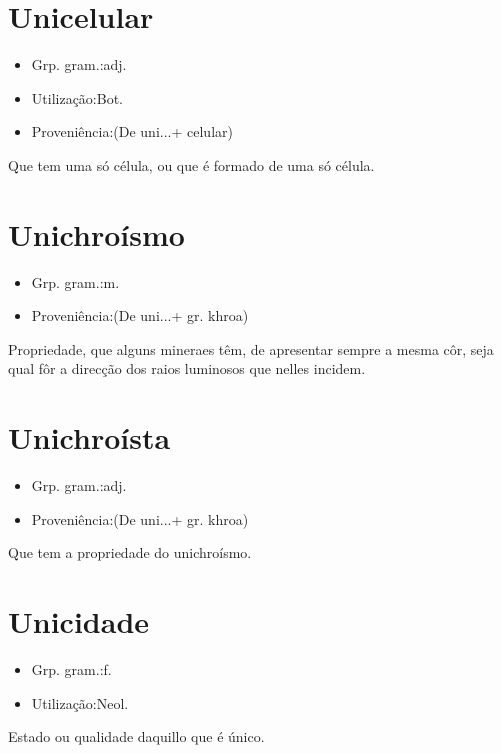\documentclass{article}
\begin{document}
\section{Unicelular}
\begin{itemize}
\item {Grp. gram.:adj.}
\end{itemize}
\begin{itemize}
\item {Utilização:Bot.}
\end{itemize}
\begin{itemize}
\item {Proveniência:(De \textunderscore uni...\textunderscore  + \textunderscore celular\textunderscore )}
\end{itemize}
Que tem uma só célula, ou que é formado de uma só célula.
\section{Unichroísmo}
\begin{itemize}
\item {Grp. gram.:m.}
\end{itemize}
\begin{itemize}
\item {Proveniência:(De \textunderscore uni...\textunderscore  + gr. \textunderscore khroa\textunderscore )}
\end{itemize}
Propriedade, que alguns mineraes têm, de apresentar sempre a mesma côr, seja qual fôr a direcção dos raios luminosos que nelles incidem.
\section{Unichroísta}
\begin{itemize}
\item {Grp. gram.:adj.}
\end{itemize}
\begin{itemize}
\item {Proveniência:(De \textunderscore uni...\textunderscore  + gr. \textunderscore khroa\textunderscore )}
\end{itemize}
Que tem a propriedade do unichroísmo.
\section{Unicidade}
\begin{itemize}
\item {Grp. gram.:f.}
\end{itemize}
\begin{itemize}
\item {Utilização:Neol.}
\end{itemize}
Estado ou qualidade daquillo que é único.
\end{document}
